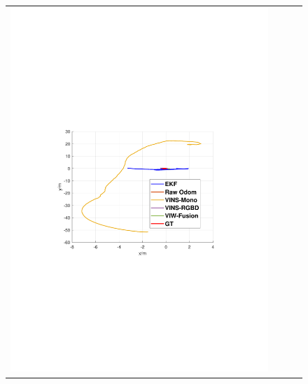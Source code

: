 \documentclass[conference]{IEEEtran}
\begin{document}
\begin{figure}
\begin{center}
\begin{tabular}{cccc}
				\includegraphics[scale=0.26]{fig/rotation3.pdf}&

\end{tabular}
\end{center}
\end{figure}
\end{document}
